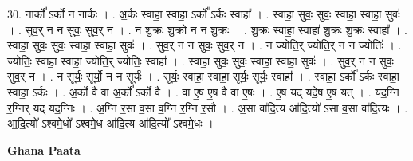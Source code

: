 \documentclass[17pt]{extarticle}
\begin{document}
30. नार्को᳚ ऽर्को न नार्कः । . अ॒र्कः स्वाहा॒ स्वाहा॒ ऽर्को᳚ ऽर्कः स्वाहा᳚ । . स्वाहा॒ सुवः॒ सुवः॒ स्वाहा॒ स्वाहा॒ सुवः॑ । . सुव॒र् न न सुवः॒ सुव॒र् न । . न शु॒क्रः शु॒क्रो न न शु॒क्रः । . शु॒क्रः स्वाहा॒ स्वाहा॑ शु॒क्रः शु॒क्रः स्वाहा᳚ । . स्वाहा॒ सुवः॒ सुवः॒ स्वाहा॒ स्वाहा॒ सुवः॑ । . सुव॒र् न न सुवः॒ सुव॒र् न । . न ज्योति॒र् ज्योति॒र् न न ज्योतिः॑ । . ज्योतिः॒ स्वाहा॒ स्वाहा॒ ज्योति॒र् ज्योतिः॒ स्वाहा᳚ । . स्वाहा॒ सुवः॒ सुवः॒ स्वाहा॒ स्वाहा॒ सुवः॑ । . सुव॒र् न न सुवः॒ सुव॒र् न । . न सूर्यः॒ सूर्यो॒ न न सूर्यः॑ । . सूर्यः॒ स्वाहा॒ स्वाहा॒ सूर्यः॒ सूर्यः॒ स्वाहा᳚ । . स्वाहा॒ ऽर्को᳚ ऽर्कः स्वाहा॒ स्वाहा॒ ऽर्कः । . अ॒र्को वै वा अ॒र्को᳚ ऽर्को वै । . वा ए॒ष ए॒ष वै वा ए॒षः । . ए॒ष यद् यदे॒ष ए॒ष यत् । . यद॒ग्नि र॒ग्निर् यद् यद॒ग्निः । . अ॒ग्नि र॒सा व॒सा व॒ग्नि र॒ग्नि र॒सौ । . अ॒सा वा॑दि॒त्य आ॑दि॒त्यो॑ ऽसा व॒सा वा॑दि॒त्यः । . आ॒दि॒त्यो᳚ ऽश्वमे॒धो᳚ ऽश्वमे॒ध आ॑दि॒त्य आ॑दि॒त्यो᳚ ऽश्वमे॒धः । \newline

\textbf{Ghana Paata } \newline
\end{document}
